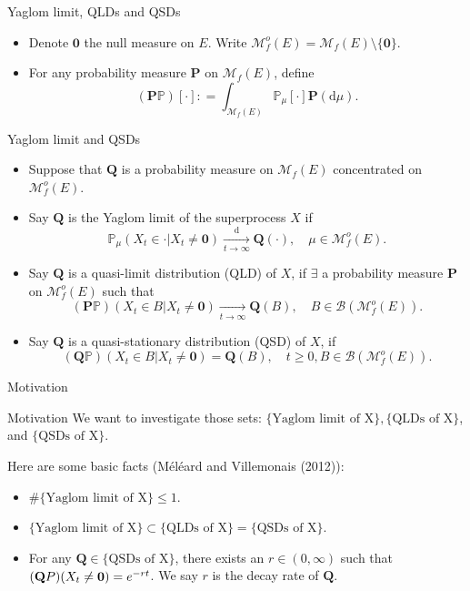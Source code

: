\documentclass[xcolor=dvipsnames]{beamer}
\begin{document}
\begin{frame}{Yaglom limit, QLDs and QSDs}
\begin{itemize}
\item 
	Denote $\mathbf 0$ the null measure on $E$. 
	Write $\mathcal M_f^o(E) = \mathcal M_f(E)\setminus \{\mathbf 0\}$. 
\item 
	For any probability measure $\mathbf P$ on $\mathcal M_f(E)$, define \[(\mathbf P \mathbb P)[\cdot]: = \int_{\mathcal M_f(E)} \mathbb P_\mu[\cdot] \mathbf P(\mathrm d\mu).\]
\end{itemize}
\end{frame}

\begin{frame}{Yaglom limit and QSDs}
\begin{itemize}
\item
	Suppose that $\mathbf Q$ is a probability measure on $\mathcal M_f(E)$ concentrated on $\mathcal M_f^o(E)$.
\item 
	Say $\mathbf Q$ is the {\color{red} Yaglom limit} of the superprocess $X$ if 
\[
	\mathbb P_\mu(X_t \in \cdot | X_t\neq \mathbf 0) \xrightarrow[t\to \infty]{\text{d}} \mathbf Q(\cdot), \quad \mu \in \mathcal M_f^o(E).
\]
\item 
	Say $\mathbf Q$ is a {\color{red} quasi-limit distribution (QLD)} of $X$, if $\exists$ a probability measure $\mathbf P$ on $\mathcal M_f^o(E)$ such that
\[
	(\mathbf P \mathbb P)(X_t \in B|X_t\neq \mathbf 0) \xrightarrow[t\to \infty]{} \mathbf Q(B), \quad B\in \mathcal B(\mathcal M_f^o(E)).
\]		
\item 
	Say $\mathbf Q$ is a {\color{red} quasi-stationary distribution (QSD)} of $X$, if 
\[
	(\mathbf Q \mathbb P)(X_t \in B|X_t\neq \mathbf 0) = \mathbf Q(B), \quad t\geq 0, B\in \mathcal B(\mathcal M_f^o(E)).
\]		
\end{itemize}
\end{frame}

\begin{frame}{Motivation}
\begin{block}{Motivation}
	We want to investigate those sets: $\{\text{Yaglom limit of X}\}, \{\text{QLDs of X}\}$, and  $\{\text{QSDs of X}\}$.
\end{block}
Here are some basic facts (M\'el\'eard and Villemonais (2012)):
\begin{itemize}
\item 
	$\# \{\text{Yaglom limit of X}\} \leq 1$.
\item
	$ \{\text{Yaglom limit of X}\} \subset \{\text{QLDs of X}\} = \{\text{QSDs of X}\}$.
\item
	For any $\mathbf Q \in \{\text{QSDs of X}\}$, there exists an $r \in (0,\infty)$ such that $(\mathbf Q \mathbb \mathbb P)(X_t \neq \mathbf 0) = e^{-rt}$. We say $r$ is the {\color{red} decay rate} of $\mathbf Q$.
\end{itemize}
\end{frame}
\end{document}
